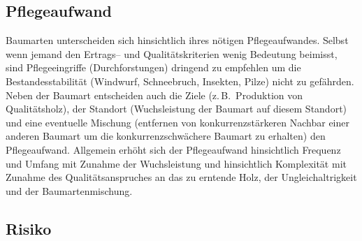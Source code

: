 \documentclass[twocolumn]{scrartcl}
\begin{document}
\subsection{Pflegeaufwand}
\label{ssec:pflegeaufwand}

Baumarten unterscheiden sich hinsichtlich ihres nötigen
Pflegeaufwandes. Selbst wenn jemand den Ertrags-- und
Qualitätskriterien wenig Bedeutung beimisst, sind Pflegeeingriffe
(Durchforstungen) dringend zu empfehlen um die Bestandesstabilität
(Windwurf, Schneebruch, Insekten, Pilze) nicht zu gefährden. Neben der
Baumart entscheiden auch die Ziele (z.\,B.\ Produktion von
Qualitätsholz), der Standort (Wuchsleistung der Baumart auf diesem
Standort) und eine eventuelle Mischung (entfernen von
konkurrenzstärkeren Nachbar einer anderen Baumart um die
konkurrenzschwächere Baumart zu erhalten) den Pflegeaufwand. Allgemein
erhöht sich der Pflegeaufwand hinsichtlich Frequenz und Umfang mit
Zunahme der Wuchsleistung und hinsichtlich Komplexität mit Zunahme des
Qualitätsanspruches an das zu erntende Holz, der Ungleichaltrigkeit
und der Baumartenmischung.

\subsection{Risiko}
\label{ssec:risiko}
\end{document}
